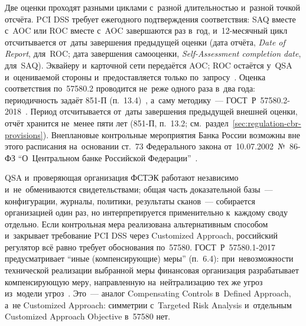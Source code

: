 Две оценки проходят разными циклами с~разной длительностью и~разной точкой
отсчёта. PCI DSS требует ежегодного подтверждения соответствия: SAQ вместе
с~AOC или ROC вместе с~AOC завершаются раз в~год, и~12-месячный цикл
отсчитывается от~даты завершения предыдущей оценки (дата отчёта,
  \textit{Date of Report}, для~ROC; дата завершения самооценки,
\textit{Self-Assessment completion date}, для~SAQ). Эквайеру и~карточной сети передаётся
AOC; ROC остаётся у~QSA и~оцениваемой стороны
и~предоставляется только по~запросу~\cite{pci-saq}. Оценка соответствия
по~57580.2 проводится не~реже одного раза в~два года: периодичность задаёт
851-П (п.~13.4)~\cite{cbr-851p}, а~саму методику~---
ГОСТ~Р~57580.2-2018~\cite{gost-57580-2}. Период отсчитывается от~даты
завершения предыдущей внешней оценки, отчёт хранится не~менее пяти лет (851-П,
п.~13.2; см.~раздел~\ref{sec:regulation-cbr-provisions}). Внеплановые контрольные
мероприятия Банка России возможны вне этого расписания на~основании ст.~73
Федерального закона от~10.07.2002~№~86-ФЗ \enquote{О~Центральном банке
Российской Федерации}~\cite{fz-86}.

QSA и~проверяющая организация ФСТЭК
работают независимо и~не~обмениваются свидетельствами; общая часть
доказательной базы~--- конфигурации, журналы, политики, результаты сканов~---
собирается организацией один раз, но интерпретируется применительно к~каждому своду отдельно.
Если контрольная мера реализована альтернативным способом и~закрывает требование PCI DSS
через Customized Approach, российский регулятор всё равно требует обоснования
по~57580. ГОСТ~Р~57580.1-2017 предусматривает \enquote{иные (компенсирующие)
меры} (п.~6.4): при~невозможности технической реализации выбранной меры
финансовая организация разрабатывает компенсирующую меру, направленную
на~нейтрализацию тех же угроз из~модели угроз~\cite{gost-57580-1}.
Это~--- аналог Compensating Controls в~Defined Approach, а~не Customized
Approach: симметрии с~Targeted Risk Analysis и~отдельным Customized Approach
Objective в~57580 нет.
